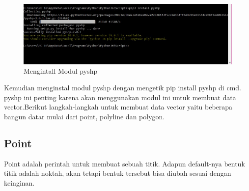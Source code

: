 \begin{figure}[htbp]
\centering
\includegraphics[width=1\textwidth]{pictures/installpy.jpg}
\caption{Mengintall Modul pyshp}
\label{labelgambar3}
\end{figure}
Kemudian menginstal modul pyshp dengan mengetik pip install pyshp di cmd. pyshp ini penting karena akan menggunakan modul ini untuk membuat data vector.Berikut langkah-langkah untuk membuat data vector yaitu beberapa bangun datar mulai dari point, polyline dan polygon. 

\subsection{Point}
Point adalah perintah untuk membuat sebuah titik. Adapun default-nya bentuk titik adalah noktah, akan tetapi bentuk tersebut bisa diubah sesuai dengan keinginan.

